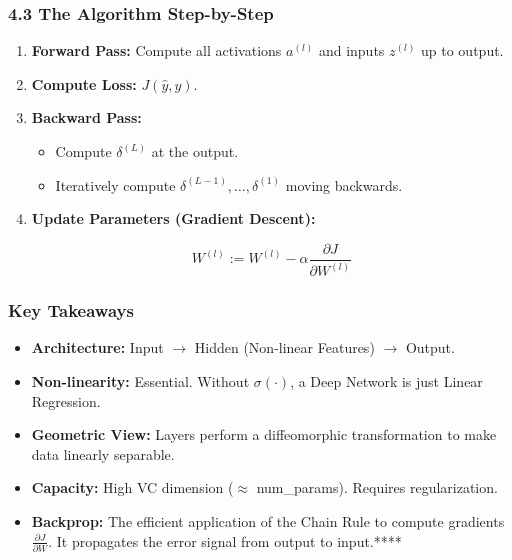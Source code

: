 \documentclass[
  italian,
  11pt,
]{article}
\begin{document}
\subsubsection{4.3 The Algorithm
Step-by-Step}\label{the-algorithm-step-by-step}

\begin{enumerate}
\def\labelenumi{\arabic{enumi}.}
\item
  \textbf{Forward Pass:} Compute all activations \(a^{(l)}\) and inputs
  \(z^{(l)}\) up to output.
\item
  \textbf{Compute Loss:} \(J(\hat{y}, y)\).
\item
  \textbf{Backward Pass:}

  \begin{itemize}
  \item
    Compute \(\delta^{(L)}\) at the output.
  \item
    Iteratively compute \(\delta^{(L-1)}, \dots, \delta^{(1)}\) moving
    backwards.
  \end{itemize}
\item
  \textbf{Update Parameters (Gradient Descent):}

  \[W^{(l)} := W^{(l)} - \alpha \frac{\partial J}{\partial W^{(l)}}\]
\end{enumerate}

\subsubsection{Key Takeaways}\label{key-takeaways-22}

\begin{itemize}
\item
  \textbf{Architecture:} Input \(\to\) Hidden (Non-linear Features)
  \(\to\) Output.
\item
  \textbf{Non-linearity:} Essential. Without \(\sigma(\cdot)\), a Deep
  Network is just Linear Regression.
\item
  \textbf{Geometric View:} Layers perform a diffeomorphic transformation
  to make data linearly separable.
\item
  \textbf{Capacity:} High VC dimension (\(\approx\) num\_params).
  Requires regularization.
\item
  \textbf{Backprop:} The efficient application of the Chain Rule to
  compute gradients \(\frac{\partial J}{\partial W}\). It propagates the
  error signal from output to input.****

  \newpage
\end{itemize}
\end{document}
